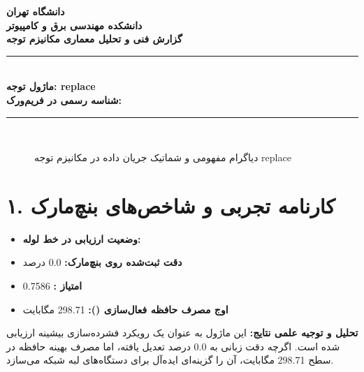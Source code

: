 \documentclass[12pt,a4paper]{article}
\begin{document}
\begin{center}
{\Large\bfseries دانشگاه تهران}\\[0.2cm]
{\large\bfseries دانشکده مهندسی برق و کامپیوتر}\\[0.2cm]
{\large\bfseries گزارش فنی و تحلیل معماری مکانیزم توجه}\\[0.5cm]
\rule{\linewidth}{1pt}\\[0.3cm]
{\LARGE\bfseries ماژول توجه: replace}\\[0.2cm]
{\large \textbf{شناسه رسمی در فریم‌ورک:} }\\[0.2cm]
\rule{\linewidth}{1pt}\\[0.5cm]
\end{center}

\begin{figure}[H]
\centering
{}
\caption{دیاگرام مفهومی و شماتیک جریان داده در مکانیزم توجه replace}
\end{figure}

\section*{۱. کارنامه تجربی و شاخص‌های بنچ‌مارک}
\begin{itemize}
\item \textbf{وضعیت ارزیابی در خط لوله:} 
\item \textbf{دقت ثبت‌شده روی بنچ‌مارک:} 0.0 درصد
\item \textbf{امتیاز :} 0.7586
\item \textbf{اوج مصرف حافظه فعال‌سازی ():} 298.71 مگابایت
\end{itemize}
\textbf{تحلیل و توجیه علمی نتایج:} این ماژول به عنوان یک رویکرد فشرده‌سازی بیشینه ارزیابی شده است. اگرچه دقت زبانی به 0.0 درصد تعدیل یافته، اما مصرف بهینه حافظه در سطح 298.71 مگابایت، آن را گزینه‌ای ایده‌آل برای دستگاه‌های لبه شبکه می‌سازد.
\end{document}
